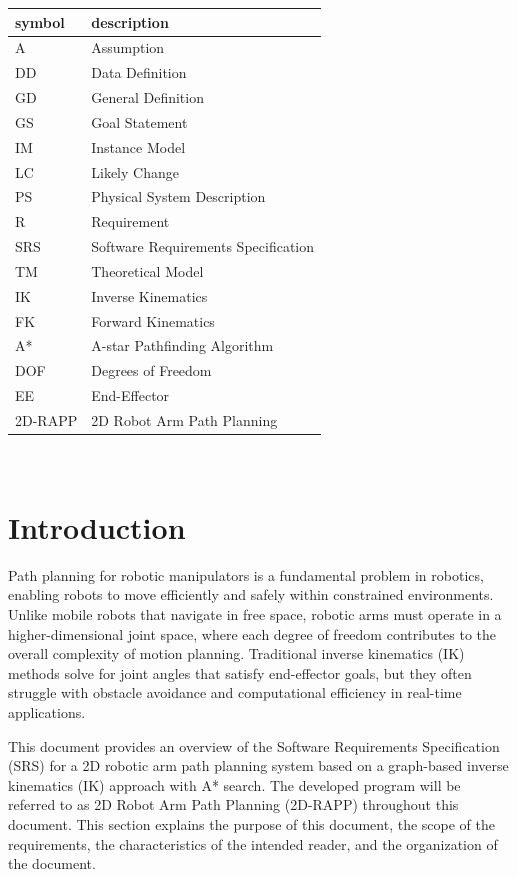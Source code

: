 \documentclass[12pt]{article}
\begin{document}
\renewcommand{\arraystretch}{1.2}
\begin{tabular}{l l} 
  \toprule		
  \textbf{symbol} & \textbf{description}\\
  \midrule 
  A & Assumption\\
  DD & Data Definition\\
  GD & General Definition\\
  GS & Goal Statement\\
  IM & Instance Model\\
  LC & Likely Change\\
  PS & Physical System Description\\
  R & Requirement\\
  SRS & Software Requirements Specification\\
  TM & Theoretical Model\\
  IK & Inverse Kinematics \\
  FK & Forward Kinematics \\
  A* & A-star Pathfinding Algorithm \\
  DOF & Degrees of Freedom \\
  EE & End-Effector \\
  2D-RAPP & 2D Robot Arm Path Planning\\
  \bottomrule
\end{tabular}\\





\section{Introduction}
Path planning for robotic manipulators is a fundamental problem in robotics, enabling robots to move efficiently and safely within constrained environments. Unlike mobile robots that navigate in free space, robotic arms must operate in a higher-dimensional joint space, where each degree of freedom contributes to the overall complexity of motion planning. Traditional inverse kinematics (IK) methods solve for joint angles that satisfy end-effector goals, but they often struggle with obstacle avoidance and computational efficiency in real-time applications.

This document provides an overview of the Software Requirements Specification (SRS) for a 2D robotic arm path planning system based on a graph-based inverse kinematics (IK) approach with A* search. The developed program will be referred to as 2D Robot Arm Path Planning (2D-RAPP) throughout this document. This section explains the purpose of this document, the scope of the requirements, the characteristics of the intended reader, and the organization of the document.
\end{document}
